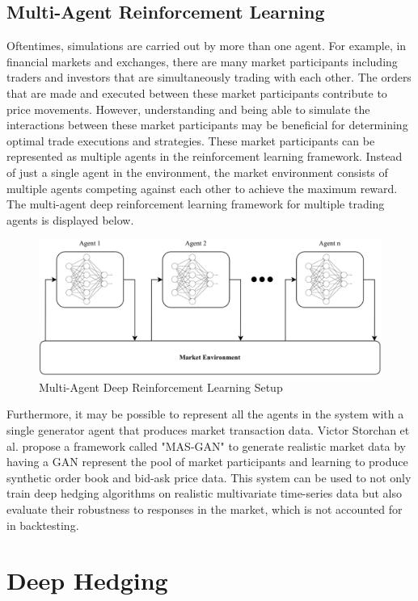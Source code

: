 \subsection{Multi-Agent Reinforcement Learning}
Oftentimes, simulations are carried out by more than one agent. For example, in financial markets and exchanges, there are many market participants including traders and investors that are simultaneously trading with each other. The orders that are made and executed between these market participants contribute to price movements. However, understanding and being able to simulate the interactions between these market participants may be beneficial for determining optimal trade executions and strategies. These market participants can be represented as multiple agents in the reinforcement learning framework. Instead of just a single agent in the environment, the market environment consists of multiple agents competing against each other to achieve the maximum reward. The multi-agent deep reinforcement learning framework for multiple trading agents is displayed below.
\begin{figure}[h]
\centering
\includegraphics[width=12cm]{templates/assets/drl/madrl.png}
\caption{Multi-Agent Deep Reinforcement Learning Setup}
\end{figure}

\noindent Furthermore, it may be possible to represent all the agents in the system with a single generator agent that produces market transaction data. Victor Storchan et al. propose a framework called "MAS-GAN" \cite{mas-gan} to generate realistic market data by having a GAN represent the pool of market participants and learning to produce synthetic order book and bid-ask price data. This system can be used to not only train deep hedging algorithms on realistic multivariate time-series data but also evaluate their robustness to responses in the market, which is not accounted for in backtesting.

\section{Deep Hedging}

